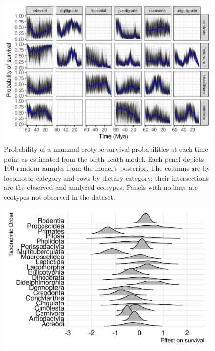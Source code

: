 \documentclass[12pt,letterpaper]{article}
\begin{document}
\begin{figure}[ht]
  \centering
  \includegraphics[width=\textwidth,height=0.4\textheight,keepaspectratio=true]{figure/ecotype_survival_bd}
  \caption[Ecotype survival probability estimated from the birth-death model]{Probability of a mammal ecotype survival probabilities at each time point as estimated from the birth-death model. Each panel depicts 100 random samples from the model's posterior. The columns are by locomotor category and rows by dietary category; their intersections are the observed and analyzed ecotypes. Panels with no lines are ecotypes not observed in the dataset.}
  \label{fig:eco_survival}
\end{figure}

\begin{figure}[ht]
  \centering
  \includegraphics[width=\textwidth,height=0.4\textheight,keepaspectratio=true]{figure/order_survival_bd}
  \caption{}
  \label{fig:order_surv}
\end{figure}
\end{document}
